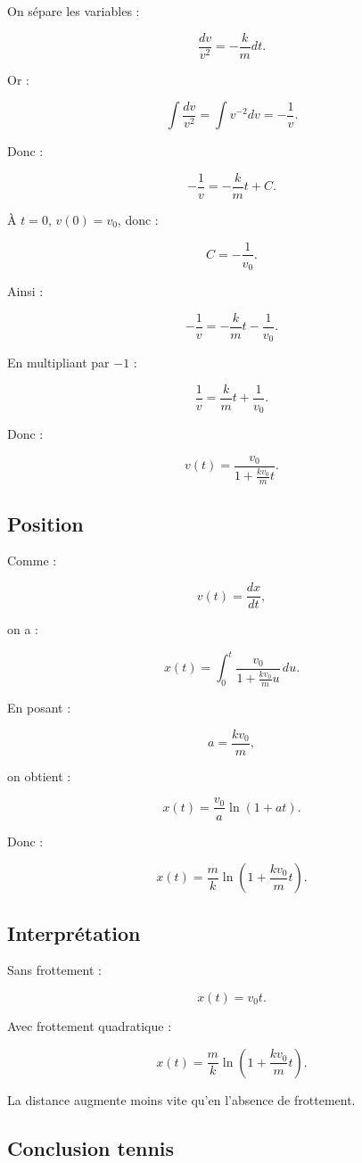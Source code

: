 \documentclass[11pt,a4paper]{article}
\begin{document}
On sépare les variables :

\[
\frac{dv}{v^2}=-\frac{k}{m}dt.
\]

Or :

\[
\int \frac{dv}{v^2}=\int v^{-2}dv=-\frac{1}{v}.
\]

Donc :

\[
-\frac1v=-\frac{k}{m}t+C.
\]

À $t=0$, $v(0)=v_0$, donc :

\[
C=-\frac1{v_0}.
\]

Ainsi :

\[
-\frac1v=-\frac{k}{m}t-\frac1{v_0}.
\]

En multipliant par $-1$ :

\[
\frac1v=\frac{k}{m}t+\frac1{v_0}.
\]

Donc :

\[
v(t)=\frac{v_0}{1+\frac{k v_0}{m}t}.
\]

\subsection{Position}

Comme :

\[
v(t)=\frac{dx}{dt},
\]

on a :

\[
x(t)=\int_0^t \frac{v_0}{1+\frac{k v_0}{m}u}\,du.
\]

En posant :

\[
a=\frac{k v_0}{m},
\]

on obtient :

\[
x(t)=\frac{v_0}{a}\ln(1+at).
\]

Donc :

\[
x(t)=\frac{m}{k}\ln\left(1+\frac{k v_0}{m}t\right).
\]

\subsection{Interprétation}

Sans frottement :

\[
x(t)=v_0t.
\]

Avec frottement quadratique :

\[
x(t)=\frac{m}{k}\ln\left(1+\frac{k v_0}{m}t\right).
\]

La distance augmente moins vite qu'en l'absence de frottement.

\subsection{Conclusion tennis}
\end{document}
